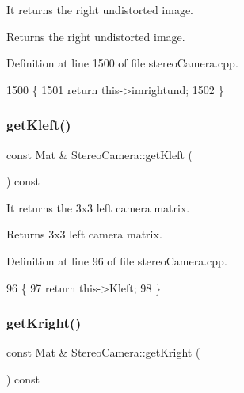 It returns the right undistorted image. 

\begin{DoxyReturn}{Returns}
the right undistorted image. 
\end{DoxyReturn}


Definition at line 1500 of file stereo\+Camera.\+cpp.


\begin{DoxyCode}
1500                                              \{
1501     \textcolor{keywordflow}{return} this->imrightund;
1502 \}
\end{DoxyCode}
\mbox{\label{classStereoCamera_a932e0ebd63c3e9a93b33c1846459aadc}} 
\subsubsection{\texorpdfstring{get\+Kleft()}{getKleft()}}
{\footnotesize\ttfamily const Mat \& Stereo\+Camera\+::get\+Kleft (\begin{DoxyParamCaption}{ }\end{DoxyParamCaption}) const}



It returns the 3x3 left camera matrix. 

\begin{DoxyReturn}{Returns}
3x3 left camera matrix. 
\end{DoxyReturn}


Definition at line 96 of file stereo\+Camera.\+cpp.


\begin{DoxyCode}
96                                         \{
97     \textcolor{keywordflow}{return} this->Kleft;
98 \}
\end{DoxyCode}
\mbox{\label{classStereoCamera_a6f9e53e949b77cd19e28a4ec92034a3d}} 
\subsubsection{\texorpdfstring{get\+Kright()}{getKright()}}
{\footnotesize\ttfamily const Mat \& Stereo\+Camera\+::get\+Kright (\begin{DoxyParamCaption}{ }\end{DoxyParamCaption}) const}



